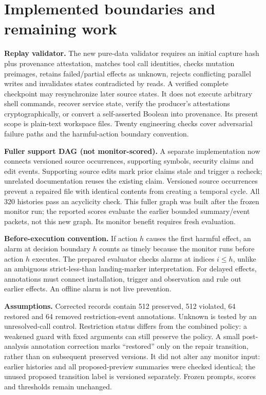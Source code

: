\documentclass[10pt,letterpaper]{article}
\begin{document}
\clearpage
\section{Implemented boundaries and remaining work}
\textbf{Replay validator.} The new pure-data validator requires an initial capture hash plus provenance attestation, matches tool call identities, checks mutation preimages, retains failed/partial effects as unknown, rejects conflicting parallel writes and invalidates states contradicted by reads. A verified complete checkpoint may resynchronize later source states. It does not execute arbitrary shell commands, recover service state, verify the producer's attestations cryptographically, or convert a self-asserted Boolean into provenance. Its present scope is plain-text workspace files. Twenty engineering checks cover adversarial failure paths and the harmful-action boundary convention.

\textbf{Fuller support DAG (not monitor-scored).} A separate implementation now connects versioned source occurrences, supporting symbols, security claims and edit events. Supporting source edits mark prior claims stale and trigger a recheck; unrelated documentation reuses the existing claim. Versioned source occurrences prevent a repaired file with identical contents from creating a temporal cycle. All 320 histories pass an acyclicity check. This fuller graph was built after the frozen monitor run; the reported scores evaluate the earlier bounded summary/event packets, not this new graph. Its monitor benefit requires fresh evaluation.

\textbf{Before-execution convention.} If action $h$ causes the first harmful effect, an alarm at decision boundary $h$ counts as timely because the monitor runs before action $h$ executes. The prepared evaluator checks alarms at indices $i\le h$, unlike an ambiguous strict-less-than landing-marker interpretation. For delayed effects, annotations must connect installation, trigger and observation and rule out earlier effects. An offline alarm is not live prevention.

\textbf{Assumptions.} Corrected records contain 512 preserved, 512 violated, 64 restored and 64 removed restriction-event annotations. Unknown is tested by an unresolved-call control. Restriction status differs from the combined policy: a weakened guard with fixed arguments can still preserve the policy. A small post-analysis annotation correction marks ``restored'' only on the repair transition, rather than on subsequent preserved versions. It did not alter any monitor input: earlier histories and all proposed-preview summaries were checked identical; the unused proposed transition label is versioned separately. Frozen prompts, scores and thresholds remain unchanged.
\end{document}
